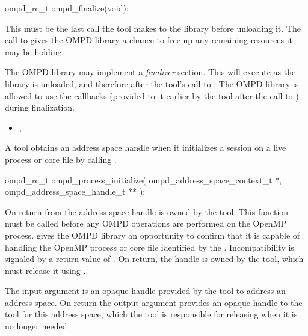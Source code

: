 \format

\cspecificstart
\begin{ompSyntax}
ompd_rc_t ompd_finalize(void);
\end{ompSyntax}
\cspecificend


\descr
This must be the last call the tool makes to the library before
unloading it. The call to  gives the OMPD library a chance to
free up any remaining resources it may be holding.

The OMPD library may implement a \emph{finalizer} section. This will execute as the library is 
unloaded, and therefore after the tool's call to . The OMPD library is allowed 
to use the callbacks (provided to it earlier by the tool after the call to 
) during finalization.

\crossreferences
\begin{itemize}
	\item
	, 
\end{itemize}


\label{ompd:ompd_process_initialize}
\summary
A tool obtains an address space handle when it initializes
a session on a live process or core file by calling .

\format

\cspecificstart
\begin{ompSyntax}
ompd_rc_t ompd_process_initialize(
  ompd_address_space_context_t *,
  ompd_address_space_handle_t **
);
\end{ompSyntax}
\cspecificend


\descr
On return from  the address
space handle is owned by the tool. This function must be called before any OMPD operations 
are performed on the OpenMP process.  gives the OMPD library an 
opportunity to confirm that it is capable of handling the OpenMP process or core file identified by 
the . Incompatibility is signaled by a return value of . 
On return, the handle is owned by the tool, which must release it using 
.

\argdesc
The input argument  is an opaque handle provided by the tool
to address an address space.
On return the output argument  provides an opaque handle to the
tool for this address space, which the tool is responsible for 
releasing when it is no longer needed

